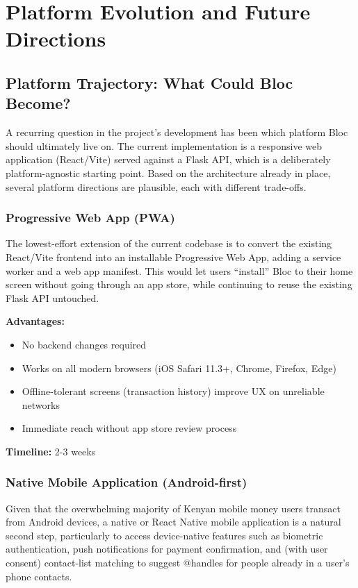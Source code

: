 \documentclass[12pt, a4paper, twoside, openright]{report}
\begin{document}
\chapter{Platform Evolution and Future Directions}

\section{Platform Trajectory: What Could Bloc Become?}

A recurring question in the project's development has been which platform Bloc should ultimately live on. The current implementation is a responsive web application (React/Vite) served against a Flask API, which is a deliberately platform-agnostic starting point. Based on the architecture already in place, several platform directions are plausible, each with different trade-offs.

\subsection{Progressive Web App (PWA)}

The lowest-effort extension of the current codebase is to convert the existing React/Vite frontend into an installable Progressive Web App, adding a service worker and a web app manifest. This would let users ``install'' Bloc to their home screen without going through an app store, while continuing to reuse the existing Flask API untouched.

\textbf{Advantages:}
\begin{itemize}
    \item No backend changes required
    \item Works on all modern browsers (iOS Safari 11.3+, Chrome, Firefox, Edge)
    \item Offline-tolerant screens (transaction history) improve UX on unreliable networks
    \item Immediate reach without app store review process
\end{itemize}

\textbf{Timeline:} 2-3 weeks

\subsection{Native Mobile Application (Android-first)}

Given that the overwhelming majority of Kenyan mobile money users transact from Android devices, a native or React Native mobile application is a natural second step, particularly to access device-native features such as biometric authentication, push notifications for payment confirmation, and (with user consent) contact-list matching to suggest @handles for people already in a user's phone contacts.
\end{document}
